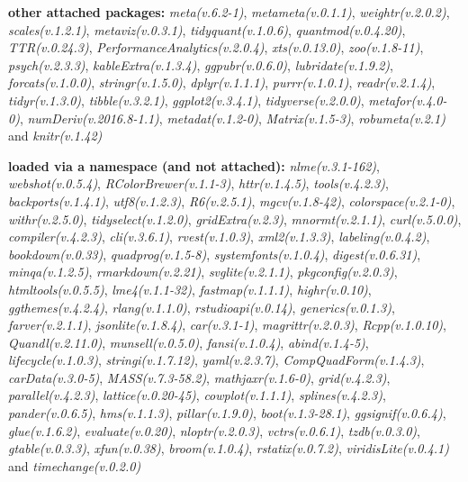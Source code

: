 \documentclass[
  bookmarksnumbered]{article}
\begin{document}
\textbf{other attached packages:}
\emph{meta(v.6.2-1)}, \emph{metameta(v.0.1.1)}, \emph{weightr(v.2.0.2)}, \emph{scales(v.1.2.1)}, \emph{metaviz(v.0.3.1)}, \emph{tidyquant(v.1.0.6)}, \emph{quantmod(v.0.4.20)}, \emph{TTR(v.0.24.3)}, \emph{PerformanceAnalytics(v.2.0.4)}, \emph{xts(v.0.13.0)}, \emph{zoo(v.1.8-11)}, \emph{psych(v.2.3.3)}, \emph{kableExtra(v.1.3.4)}, \emph{ggpubr(v.0.6.0)}, \emph{lubridate(v.1.9.2)}, \emph{forcats(v.1.0.0)}, \emph{stringr(v.1.5.0)}, \emph{dplyr(v.1.1.1)}, \emph{purrr(v.1.0.1)}, \emph{readr(v.2.1.4)}, \emph{tidyr(v.1.3.0)}, \emph{tibble(v.3.2.1)}, \emph{ggplot2(v.3.4.1)}, \emph{tidyverse(v.2.0.0)}, \emph{metafor(v.4.0-0)}, \emph{numDeriv(v.2016.8-1.1)}, \emph{metadat(v.1.2-0)}, \emph{Matrix(v.1.5-3)}, \emph{robumeta(v.2.1)} and \emph{knitr(v.1.42)}

\textbf{loaded via a namespace (and not attached):}
\emph{nlme(v.3.1-162)}, \emph{webshot(v.0.5.4)}, \emph{RColorBrewer(v.1.1-3)}, \emph{httr(v.1.4.5)}, \emph{tools(v.4.2.3)}, \emph{backports(v.1.4.1)}, \emph{utf8(v.1.2.3)}, \emph{R6(v.2.5.1)}, \emph{mgcv(v.1.8-42)}, \emph{colorspace(v.2.1-0)}, \emph{withr(v.2.5.0)}, \emph{tidyselect(v.1.2.0)}, \emph{gridExtra(v.2.3)}, \emph{mnormt(v.2.1.1)}, \emph{curl(v.5.0.0)}, \emph{compiler(v.4.2.3)}, \emph{cli(v.3.6.1)}, \emph{rvest(v.1.0.3)}, \emph{xml2(v.1.3.3)}, \emph{labeling(v.0.4.2)}, \emph{bookdown(v.0.33)}, \emph{quadprog(v.1.5-8)}, \emph{systemfonts(v.1.0.4)}, \emph{digest(v.0.6.31)}, \emph{minqa(v.1.2.5)}, \emph{rmarkdown(v.2.21)}, \emph{svglite(v.2.1.1)}, \emph{pkgconfig(v.2.0.3)}, \emph{htmltools(v.0.5.5)}, \emph{lme4(v.1.1-32)}, \emph{fastmap(v.1.1.1)}, \emph{highr(v.0.10)}, \emph{ggthemes(v.4.2.4)}, \emph{rlang(v.1.1.0)}, \emph{rstudioapi(v.0.14)}, \emph{generics(v.0.1.3)}, \emph{farver(v.2.1.1)}, \emph{jsonlite(v.1.8.4)}, \emph{car(v.3.1-1)}, \emph{magrittr(v.2.0.3)}, \emph{Rcpp(v.1.0.10)}, \emph{Quandl(v.2.11.0)}, \emph{munsell(v.0.5.0)}, \emph{fansi(v.1.0.4)}, \emph{abind(v.1.4-5)}, \emph{lifecycle(v.1.0.3)}, \emph{stringi(v.1.7.12)}, \emph{yaml(v.2.3.7)}, \emph{CompQuadForm(v.1.4.3)}, \emph{carData(v.3.0-5)}, \emph{MASS(v.7.3-58.2)}, \emph{mathjaxr(v.1.6-0)}, \emph{grid(v.4.2.3)}, \emph{parallel(v.4.2.3)}, \emph{lattice(v.0.20-45)}, \emph{cowplot(v.1.1.1)}, \emph{splines(v.4.2.3)}, \emph{pander(v.0.6.5)}, \emph{hms(v.1.1.3)}, \emph{pillar(v.1.9.0)}, \emph{boot(v.1.3-28.1)}, \emph{ggsignif(v.0.6.4)}, \emph{glue(v.1.6.2)}, \emph{evaluate(v.0.20)}, \emph{nloptr(v.2.0.3)}, \emph{vctrs(v.0.6.1)}, \emph{tzdb(v.0.3.0)}, \emph{gtable(v.0.3.3)}, \emph{xfun(v.0.38)}, \emph{broom(v.1.0.4)}, \emph{rstatix(v.0.7.2)}, \emph{viridisLite(v.0.4.1)} and \emph{timechange(v.0.2.0)}
\end{document}
